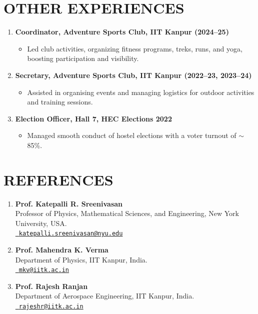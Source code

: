 \documentclass[10pt,a4paper]{article}
\begin{document}
\section{OTHER EXPERIENCES}
\begin{enumerate}[leftmargin=1.5em, itemsep=1.5pt, parsep=0pt]
  \item \textbf{Coordinator, Adventure Sports Club, IIT Kanpur (2024--25)}
    \begin{itemize}[leftmargin=1em, nosep, label=\textbullet]
      \item Led club activities, organizing fitness programs, treks, runs, and yoga, boosting participation and visibility.
    \end{itemize}
  \item \textbf{Secretary, Adventure Sports Club, IIT Kanpur (2022--23, 2023--24)}
    \begin{itemize}[leftmargin=1em, nosep, label=\textbullet]
      \item Assisted in organising events and managing logistics for outdoor activities and training sessions.
    \end{itemize}
  \item \textbf{Election Officer, Hall 7, HEC Elections 2022}
    \begin{itemize}[leftmargin=1em, nosep, label=\textbullet]
      \item Managed smooth conduct of hostel elections with a voter turnout of $\sim$85\%.
    \end{itemize}
\end{enumerate}

\section{REFERENCES}
\begin{enumerate}[leftmargin=1.5em, itemsep=0.5pt, parsep=0pt]
  \item \textbf{Prof. Katepalli R. Sreenivasan} \\
    Professor of Physics, Mathematical Sciences, and Engineering, New York University, USA. \\
    \href{mailto:katepalli.sreenivasan@nyu.edu}{\faEnvelope\ \texttt{katepalli.sreenivasan@nyu.edu}}
  \item \textbf{Prof. Mahendra K. Verma} \\
    Department of Physics, IIT Kanpur, India. \\
    \href{mailto:mkv@iitk.ac.in}{\faEnvelope\ \texttt{mkv@iitk.ac.in}}
  \item \textbf{Prof. Rajesh Ranjan} \\
    Department of Aerospace Engineering, IIT Kanpur, India. \\
    \href{mailto:rajeshr@iitk.ac.in}{\faEnvelope\ \texttt{rajeshr@iitk.ac.in}}
\end{enumerate}
\end{document}
